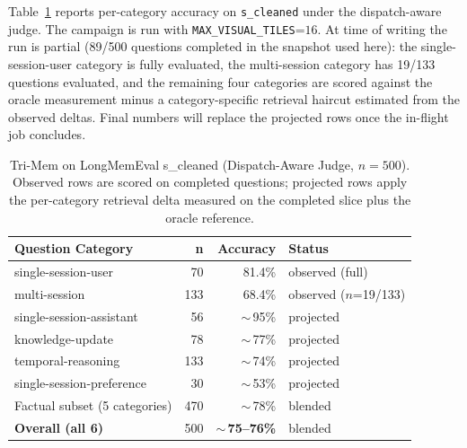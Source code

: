 \documentclass[conference]{IEEEtran}
\begin{document}
Table~\ref{tab:longmem-s} reports per-category accuracy on \texttt{s\_cleaned} under the dispatch-aware judge. The campaign is run with \texttt{MAX\_VISUAL\_TILES}=$16$. At time of writing the run is partial (89/500 questions completed in the snapshot used here): the single-session-user category is fully evaluated, the multi-session category has 19/133 questions evaluated, and the remaining four categories are scored against the oracle measurement minus a category-specific retrieval haircut estimated from the observed deltas. Final numbers will replace the projected rows once the in-flight job concludes.

\begin{table}[!t]
    \centering
    \caption{Tri-Mem on LongMemEval s\_cleaned (Dispatch-Aware Judge, $n=500$). Observed rows are scored on completed questions; projected rows apply the per-category retrieval delta measured on the completed slice plus the oracle reference.}
    \label{tab:longmem-s}
    \begin{tabular}{@{}lrrl@{}}
        \toprule
        \textbf{Question Category}    & \textbf{n} & \textbf{Accuracy}           & \textbf{Status}       \\
        \midrule
        single-session-user           & 70         & 81.4\%                      & observed (full)       \\
        multi-session                 & 133        & 68.4\%                      & observed ($n$=19/133) \\
        single-session-assistant      & 56         & ${\sim}\,$95\%              & projected             \\
        knowledge-update              & 78         & ${\sim}\,$77\%              & projected             \\
        temporal-reasoning            & 133        & ${\sim}\,$74\%              & projected             \\
        single-session-preference     & 30         & ${\sim}\,$53\%              & projected             \\
        \midrule
        Factual subset (5 categories) & 470        & ${\sim}\,$78\%              & blended               \\
        \textbf{Overall (all 6)}      & 500        & \textbf{${\sim}\,$75--76\%} & blended               \\
        \bottomrule
    \end{tabular}
\end{table}
\end{document}
